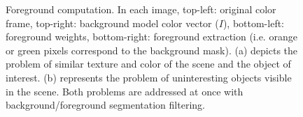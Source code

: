 \documentclass[10pt,letterpaper]{article}
\begin{document}
\begin{figure}[ht]
     \begin{center}
        \end{center}

    \caption{Foreground computation. In each image, top-left: original color frame, top-right: background model color vector ($I$), bottom-left: foreground weights, bottom-right: foreground extraction (i.e. orange or green pixels correspond to the background mask). (a) depicts the problem of similar texture and color of the scene and the object of interest. (b) represents the problem of uninteresting objects visible in the scene. Both problems are addressed at once with background/foreground segmentation filtering.}
   \label{fig:subfigures}
\end{figure}
\end{document}
